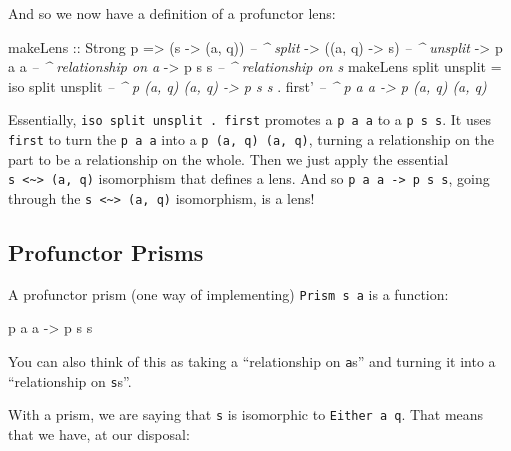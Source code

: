 \documentclass[]{article}
\newenvironment{Shaded}{}{}
\newcommand{\CommentTok}[1]{\textcolor[rgb]{0.38,0.63,0.69}{\textit{#1}}}
\newcommand{\DataTypeTok}[1]{\textcolor[rgb]{0.56,0.13,0.00}{#1}}
\newcommand{\FunctionTok}[1]{\textcolor[rgb]{0.02,0.16,0.49}{#1}}
\newcommand{\NormalTok}[1]{#1}
\newcommand{\OtherTok}[1]{\textcolor[rgb]{0.00,0.44,0.13}{#1}}
\begin{document}
And so we now have a definition of a profunctor lens:

\begin{Shaded}
\begin{Highlighting}[]
\NormalTok{makeLens}
\OtherTok{    ::} \DataTypeTok{Strong}\NormalTok{ p}
    \OtherTok{=>}\NormalTok{ (s }\OtherTok{->}\NormalTok{ (a, q))        }\CommentTok{-- ^ split}
    \OtherTok{->}\NormalTok{ ((a, q) }\OtherTok{->}\NormalTok{ s)        }\CommentTok{-- ^ unsplit}
    \OtherTok{->}\NormalTok{ p a a                }\CommentTok{-- ^ relationship on a}
    \OtherTok{->}\NormalTok{ p s s                }\CommentTok{-- ^ relationship on s}
\NormalTok{makeLens split unsplit }\FunctionTok{=}\NormalTok{ iso split unsplit  }\CommentTok{-- ^ p (a, q) (a, q) -> p s s}
                       \FunctionTok{.}\NormalTok{ first'             }\CommentTok{-- ^ p a a -> p (a, q) (a, q)}
\end{Highlighting}
\end{Shaded}

Essentially, \texttt{iso\ split\ unsplit\ .\ first\textquotesingle{}} promotes a
\texttt{p\ a\ a} to a \texttt{p\ s\ s}. It uses \texttt{first\textquotesingle{}}
to turn the \texttt{p\ a\ a} into a \texttt{p\ (a,\ q)\ (a,\ q)}, turning a
relationship on the part to be a relationship on the whole. Then we just apply
the essential \texttt{s\ \textless{}\textasciitilde{}\textgreater{}\ (a,\ q)}
isomorphism that defines a lens. And so
\texttt{p\ a\ a\ -\textgreater{}\ p\ s\ s}, going through the
\texttt{s\ \textless{}\textasciitilde{}\textgreater{}\ (a,\ q)} isomorphism, is
a lens!

\hypertarget{profunctor-prisms}{%
\subsection{Profunctor Prisms}\label{profunctor-prisms}}

A profunctor prism (one way of implementing)
\texttt{Prism\textquotesingle{}\ s\ a} is a function:

\begin{Shaded}
\begin{Highlighting}[]
\NormalTok{p a a }\OtherTok{->}\NormalTok{ p s s}
\end{Highlighting}
\end{Shaded}

You can also think of this as taking a ``relationship on \texttt{a}s'' and
turning it into a ``relationship on \texttt{s}s''.

With a prism, we are saying that \texttt{s} is isomorphic to
\texttt{Either\ a\ q}. That means that we have, at our disposal:
\end{document}
